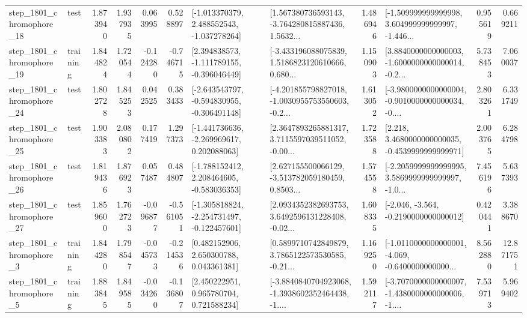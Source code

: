 \begin{tabular}{llrrrrllrlrr}
 step\_1801\_chromophore\_18 &      test &      1.873940 &    1.937935 &      0.063995 &  0.528897 &   [-1.013370379, 2.488552543, -1.037278264] &  [1.567380736593143, -3.764280815887436, 1.5632... &       1.486946 &  [-1.509999999999998, 3.604999999999997, -1.446... &            0.955619 &          0.669211 \\
 step\_1801\_chromophore\_19 &  training &      1.844824 &    1.720544 &     -0.124280 & -0.746715 &   [2.394838573, -1.111789155, -0.396046449] &  [-3.433196088075839, 1.5186823120610666, 0.680... &       1.150903 &  [3.8840000000000003, -1.6000000000000014, -0.2... &            5.738453 &          7.060037 \\
 step\_1801\_chromophore\_24 &      test &      1.802728 &    1.845253 &      0.042525 &  0.383433 &  [-2.643543797, -0.594830955, -0.306491148] &  [-4.201855798827018, -1.0030955753550603, -0.2... &       1.613052 &  [-3.9800000000000004, -0.9010000000000034, -0.... &            2.803261 &          6.331749 \\
 step\_1801\_chromophore\_25 &      test &      1.903383 &    2.080802 &      0.177419 &  1.297373 &   [-1.441736636, -2.269969617, 0.202088063] &  [2.3647893265881317, 3.7115597039511052, -0.00... &       1.723588 &   [2.218, 3.4680000000000035, -0.4539999999999971] &            2.003765 &          6.284798 \\
 step\_1801\_chromophore\_26 &      test &      1.819436 &    1.876923 &      0.057487 &  0.484807 &   [-1.788152412, 2.208464605, -0.583036353] &  [2.627155500066129, -3.513782059180459, 0.8503... &       1.574558 &  [-2.2059999999999995, 3.5869999999999997, -1.0... &            7.456196 &          5.637393 \\
 step\_1801\_chromophore\_27 &      test &      1.859600 &    1.762723 &     -0.096877 & -0.561051 &  [-1.305818824, -2.254731497, -0.122457601] &  [2.0934352382693753, 3.6492596131228408, -0.02... &       1.608335 &              [-2.046, -3.564, -0.2190000000000012] &            0.420441 &          3.388670 \\
  step\_1801\_chromophore\_3 &  training &      1.844280 &    1.798547 &     -0.045733 & -0.214536 &     [0.482152906, 2.650300788, 0.043361381] &  [0.5899710742849879, 3.7865122573530585, -0.21... &       1.169250 &  [-1.0110000000000001, -4.069, -0.6400000000000... &            8.562880 &         12.871751 \\
  step\_1801\_chromophore\_5 &  training &      1.883845 &    1.849585 &     -0.034260 & -0.136807 &     [2.450222951, 0.965780704, 0.721588234] &  [-3.8840840704923068, -1.3938602352464438, -1.... &       1.592117 &  [-3.7070000000000007, -1.4380000000000006, -1.... &            7.539713 &          5.969402 \\

\end{tabular}
